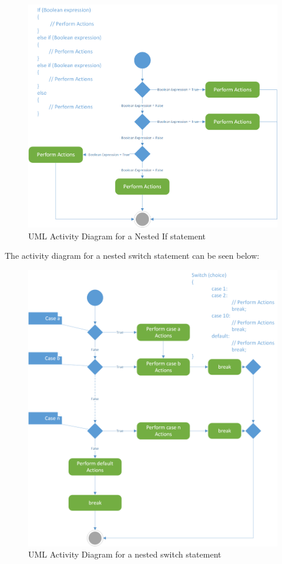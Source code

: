 \documentclass[
]{book}
\begin{document}
\begin{figure}

{\centering \includegraphics[width=1\linewidth]{images/if_elseif} 

}

\caption{UML Activity Diagram for a Nested If statement}\label{fig:unnamed-chunk-9}
\end{figure}

The activity diagram for a nested switch statement can be seen below:

\begin{figure}

{\centering \includegraphics[width=1\linewidth]{images/switch} 

}

\caption{UML Activity Diagram for a nested switch statement}\label{fig:unnamed-chunk-10}
\end{figure}
\end{document}
